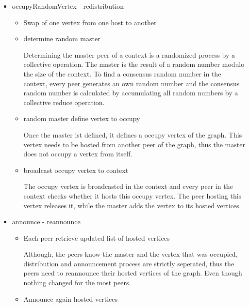 \begin{itemize}
\item occupyRandomVertex - redistribution
  \begin{itemize}
  \item Swap of one vertex from one host to another
  \item determine random master
    
    Determining the master peer of a context is a randomized process
    by a collective operation. The master is the result of a random
    number modulo the size of the context. To find a consensus random
    number in the context, every peer generates an own random number
    and the consensus random number is calculated by accumulating all
    random numbers by a collective reduce operation.

  \item random master define vertex to occupy
    
    Once the master ist defined, it defines a occupy vertex of the
    graph. This vertex needs to be hosted from another peer of the
    graph, thus the master does not occupy a vertex from itself.
    
  \item broadcast occupy vertex to context

    The occupy vertex is broadcasted in the context and every peer in
    the context checks whether it hosts this occupy vertex. The peer
    hosting this vertex releases it, while the master adds the vertex
    to its hosted vertices.

  \end{itemize}
\item announce - reannounce
  \begin{itemize}
  \item Each peer retrieve updated list of hosted vertices

    Although, the peers know the master and the vertex that was
    occupied, distribution and announcement process are strictly
    seperated, thus the peers need to reannounce their hosted vertices
    of the graph. Even though nothing changed for the most peers.

  \item Announce again hosted vertices
  \end{itemize}


\end{itemize}


\cleardoublepage

